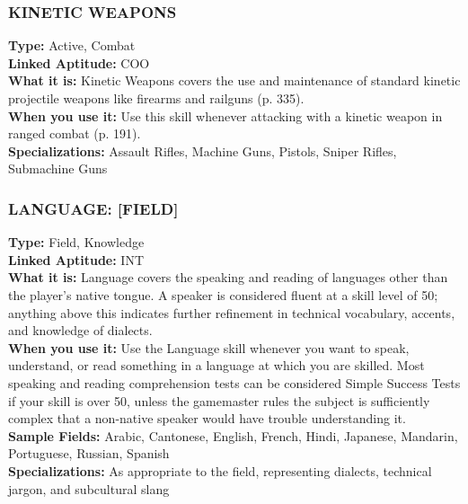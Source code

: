\subsubsection{KINETIC WEAPONS}
\textbf{Type:} Active, Combat
\\ \textbf{Linked Aptitude:} COO
\\ \textbf{What it is:} Kinetic Weapons covers the use and
maintenance of standard kinetic projectile weapons
like firearms and railguns (p. 335).
\\ \textbf{When you use it:} Use this skill whenever attacking
with a kinetic weapon in ranged combat (p. 191).
\\ \textbf{Specializations:} Assault Rifles, Machine Guns, Pistols,
Sniper Rifles, Submachine Guns


\subsubsection{LANGUAGE: [FIELD]}
\textbf{Type:} Field, Knowledge
\\ \textbf{Linked Aptitude:} INT
\\ \textbf{What it is:} Language covers the speaking and
reading of languages other than the player’s native
tongue. A speaker is considered fluent at a skill level
of 50; anything above this indicates further refinement in technical vocabulary, accents, and knowledge of dialects.
\\ \textbf{When you use it:} Use the Language skill whenever
you want to speak, understand, or read something in
a language at which you are skilled. Most speaking
and reading comprehension tests can be considered
Simple Success Tests if your skill is over 50, unless the
gamemaster rules the subject is sufficiently complex
that a non-native speaker would have trouble understanding it.
\\ \textbf{Sample Fields:} Arabic, Cantonese, English, French,
Hindi, Japanese, Mandarin, Portuguese, Russian,
Spanish
\\ \textbf{Specializations:} As appropriate to the field, representing dialects, technical jargon, and subcultural slang

